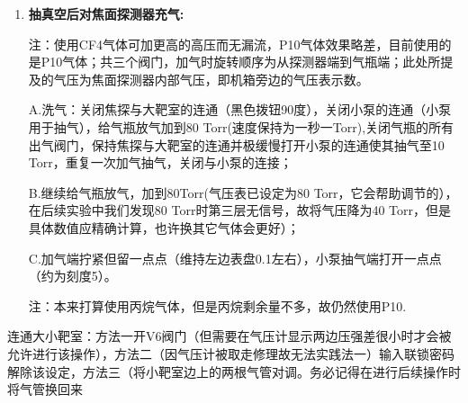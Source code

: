 \begin{enumerate}
C.打开控制柜上“总电源合闸”开关，需要把抽屉抽出，同时拨动两个拨钮；

D.先打开A2机械泵，先在控制柜操作后旋转实体旋钮，控制在一秒一Torr即可（似乎实体旋钮无效）；

E.若A2已全开但下降速度仍然较慢，打开其它机械泵，其中B、D泵仅在控制柜上操作，C泵需要额外打开实体阀门，旋转使其冒白烟（这个白烟是油泵运行时泄漏出的油），待其不冒白烟后关闭（C泵位于磁铁D1和D2之间，需要绕到后面开）（D泵是抽小靶室的，大小靶室的连通靠V6控制）；

F.气压低于100 PA （0.75 Torr)时（经验为十分钟）,打开分子泵（需开水冷），通常我们会抽到1.2e-3；

G.小靶室很难抽真空抽到较低气压，通常是与大靶室连通后再继续抽，但是连通时需要注意大小靶室的气压差尽可能小。
最终，气压应该能够稳定在9e-4pa的量级，这样就足够完成实验了。
   

  \item \textbf{抽真空后对焦面探测器充气:}

  {\kaishu 注：使用CF4气体可加更高的高压而无漏流，P10气体效果略差，目前使用的是P10气体；共三个阀门，加气时旋转顺序为从探测器端到气瓶端；此处所提及的气压为焦面探测器内部气压，即机箱旁边的气压表示数。}    

A.洗气：关闭焦探与大靶室的连通（黑色拨钮90度），关闭小泵的连通（小泵用于抽气），给气瓶放气加到80 Torr(速度保持为一秒一Torr),关闭气瓶的所有出气阀门，保持焦探与大靶室的连通并极缓慢打开小泵的连通使其抽气至10 Torr，重复一次加气抽气，关闭与小泵的连接；

B.继续给气瓶放气，加到80Torr(气压表已设定为80 Torr，它会帮助调节的），在后续实验中我们发现80 Torr时第三层无信号，故将气压降为40 Torr，但是具体数值应精确计算，也许换其它气体会更好）；


C.加气端拧紧但留一点点（维持左边表盘0.1左右），小泵抽气端打开一点点（约为刻度5）。


  {\kaishu 注：本来打算使用丙烷气体，但是丙烷剩余量不多，故仍然使用P10.} 



    
\end{enumerate}
连通大小靶室：方法一开V6阀门（但需要在气压计显示两边压强差很小时才会被允许进行该操作），方法二（因气压计被取走修理故无法实践法一）输入联锁密码解除该设定，方法三（将小靶室边上的两根气管对调。{\kaishu 务必记得在进行后续操作时将气管换回来}


